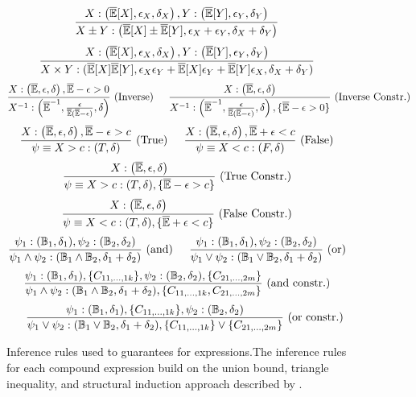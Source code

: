 \begin{figure}[!htbp]
\centering
\[
\dfrac{X: \left(\overline{\mathbb{E}}[X], \epsilon_X, \delta_X\right), Y: \left(\overline{\mathbb{E}}[Y], \epsilon_Y, \delta_Y\right)}{X \pm Y: \left(\overline{\mathbb{E}}[X] \pm \overline{\mathbb{E}}[Y], \epsilon_X + \epsilon_Y, \delta_X + \delta_Y\right)}
\]
\[
\dfrac{X: \left(\overline{\mathbb{E}}[X], \epsilon_X, \delta_X\right), Y: \left(\overline{\mathbb{E}}[Y], \epsilon_Y, \delta_Y\right)}{ X \times Y: (\overline{\mathbb{E}}[X] \overline{\mathbb{E}}[Y], \epsilon_X \epsilon_Y + \overline{\mathbb{E}}[X] \epsilon_Y + \overline{\mathbb{E}}[Y] \epsilon_X, \delta_X + \delta_Y)} 
\]
\[
\dfrac{X: \left(\overline{\mathbb{E}}, \epsilon, \delta \right), \overline{\mathbb{E}} - \epsilon > 0}{ X^{-1}: \left(\overline{\mathbb{E}}^{-1}, \frac{\epsilon}{\overline{\mathbb{E}} (\overline{\mathbb{E}} - \epsilon)}  , \delta \right)}\text{ (Inverse)} \hspace{0.2in} \dfrac{X: \left(\overline{\mathbb{E}}, \epsilon, \delta \right)}{ X^{-1}: \left(\overline{\mathbb{E}}^{-1}, \frac{\epsilon}{\overline{\mathbb{E}} (\overline{\mathbb{E}} - \epsilon)}  , \delta \right), \{ \overline{\mathbb{E}} - \epsilon > 0\}} \text{ (Inverse Constr.)}
\]
\[
\dfrac{X: \left(\overline{\mathbb{E}}, \epsilon, \delta\right), \overline{\mathbb{E}} - \epsilon > c}{\psi \equiv X > c: (T, \delta)} \text{ (True)} \hspace{0.2in} \dfrac{X: \left(\overline{\mathbb{E}}, \epsilon, \delta \right), \overline{\mathbb{E}}  + \epsilon < c}{\psi \equiv X < c: (F, \delta)} \text{ (False)} 
\] 
\[
\dfrac{X: \left(\overline{\mathbb{E}}, \epsilon, \delta\right)}{\psi \equiv X > c: (T, \delta), \{\overline{\mathbb{E}} - \epsilon > c\}} \text{ (True Constr.)} \]
\[
\dfrac{X: \left(\overline{\mathbb{E}}, \epsilon, \delta \right)}{\psi \equiv X < c: (T, \delta), \{\overline{\mathbb{E}} + \epsilon < c\}} \text{ (False Constr.)} 
\] 
\[
\dfrac{\psi_1: (\mathbb{B}_1, \delta_1), \psi_2: (\mathbb{B}_2, \delta_2)}{\psi_1 \wedge \psi_2: (\mathbb{B}_1 \wedge \mathbb{B}_2, \delta_1 + \delta_2)} \text{ (and)} \hspace{0.2in} \dfrac{\psi_1: (\mathbb{B}_1, \delta_1), \psi_2: (\mathbb{B}_2, \delta_2)}{\psi_1 \vee \psi_2: (\mathbb{B}_1 \vee \mathbb{B}_2, \delta_1 + \delta_2)} \text{ (or)}
\]
\[
\dfrac{\psi_1: (\mathbb{B}_1, \delta_1), \{C_{11, \dots, 1k}\}, \psi_2: (\mathbb{B}_2, \delta_2), \{C_{21, \dots, 2m}\}}{\psi_1 \wedge \psi_2: (\mathbb{B}_1 \wedge \mathbb{B}_2, \delta_1 + \delta_2), \{C_{11, \dots, 1k}, C_{21, \dots, 2m}\}} \text{ (and constr.)} \]
\[
\hspace{0.2in} \dfrac{\psi_1: (\mathbb{B}_1, \delta_1), \{C_{11, \dots, 1k}\}, \psi_2: (\mathbb{B}_2, \delta_2)}{\psi_1 \vee \psi_2: (\mathbb{B}_1 \vee \mathbb{B}_2, \delta_1 + \delta_2),  \{C_{11, \dots, 1k}\} \vee \{C_{21, \dots, 2m}\}} \text{ (or constr.)}
\]
\caption{Inference rules used to guarantees for expressions.The inference rules for each compound expression build on the union bound, triangle inequality, and structural induction approach described by \cite{bastani2019probabilistic}.}
\label{fig:inference}
\end{figure}
